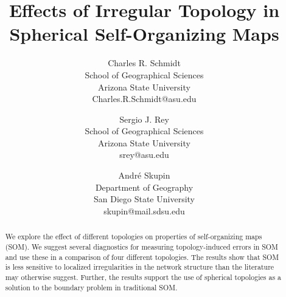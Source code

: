 \documentclass[times, 10pt,twocolumn]{article}
\begin{document}
\title{Effects of Irregular Topology in Spherical Self-Organizing Maps}

\author{
Charles R. Schmidt\\
School of Geographical Sciences\\Arizona State University\\
Charles.R.Schmidt@asu.edu\and
Sergio J. Rey\\
School of Geographical Sciences\\Arizona State University\\srey@asu.edu
\and
Andr\'e Skupin\\
Department of Geography\\San Diego State University\\
skupin@mail.sdsu.edu
}

\maketitle
\thispagestyle{empty}

\begin{abstract}
We explore the effect of different topologies on properties of self-organizing
maps (SOM). We suggest several diagnostics for measuring
topology-induced errors in SOM and use these in a comparison of four different
topologies. The results show that SOM is less sensitive to localized
irregularities in the network structure than the literature may otherwise
suggest.  Further, the results support the use of spherical topologies as a
solution to the boundary problem in traditional SOM.
  
\end{abstract}













\end{document}
